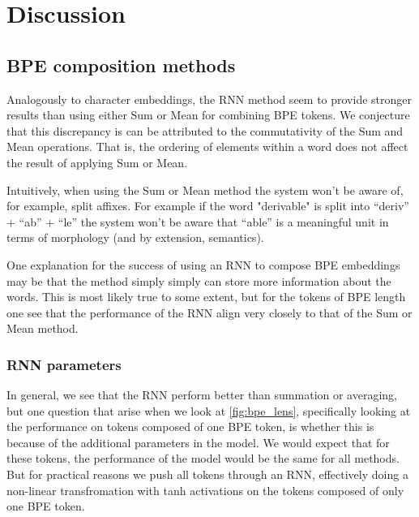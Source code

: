 \documentclass[11pt]{article}
\newcommand\jp[1]{(\textbf{JP:} #1)}
\begin{document}
	
	
	\section{Discussion}

    \subsection{BPE composition methods}
     Analogously to character embeddings, the RNN method seem
     to provide stronger results than using either Sum or Mean for
     combining BPE tokens. We conjecture that this discrepancy is can
     be attributed to the commutativity of the Sum and Mean
     operations. That is, the ordering of elements within a word does
     not affect the result of applying Sum or Mean.

     Intuitively, when using the Sum or Mean method the system won't
     be aware of, for example, split affixes. For example if the word
     "derivable" is split into ``deriv'' + ``ab'' + ``le'' the system
     won't be aware that ``able'' is a meaningful unit in terms of
     morphology (and by extension, semantics).


     One explanation for the success of using an RNN to compose BPE
     embeddings may be that the method simply simply can store more
     information about the words. This is most likely true to some
     extent, but for the tokens of BPE length one see that the
     performance of the RNN align very closely to that of the Sum or
     Mean method.

    \subsubsection{RNN parameters}
                In general, we see that the RNN perform better than
     summation or averaging, but one question that arise when we look
     at \cref{fig:bpe_lens}, specifically looking at the performance
     on tokens composed of one BPE token, is whether this is because
     of the additional parameters in the model. We would expect that
     for these tokens, the performance of the model would be the same
     for all methods. But for practical reasons we push all tokens
     through an RNN, effectively doing a non-linear transfromation
     with tanh activations on the tokens composed of only one BPE token.
\end{document}
